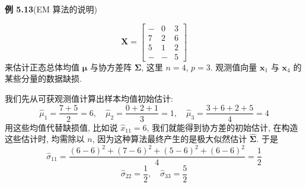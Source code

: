 \noindent\textbf{例 5.13}\quad (EM 算法的说明)

\[
\mathbf{X}=\begin{bmatrix}
-&0&3\\
7&2&6\\
5&1&2\\
-&-&5
\end{bmatrix}
\]
来估计正态总体均值 $\boldsymbol{\mu}$ 与协方差阵 $\boldsymbol{\Sigma}$, 这里 $n=4$, $p=3$. 观测值向量 $\mathbf{x}_1$ 与 $\mathbf{x}_4$ 的某些分量的数据缺损.

我们先从可获观测值计算出样本均值初始估计:
\[
\hat{\mu}_1=\frac{7+5}{2}=6, \quad
\hat{\mu}_2=\frac{0+2+1}{3}=1, \quad
\hat{\mu}_3=\frac{3+6+2+5}{4}=4
\]
用这些均值代替缺损值, 比如说 $\hat{x}_{11}=6$, 我们就能得到协方差的初始估计, 在构造这些估计时, 均需除以 $n$, 因为这种算法最终产生的是极大似然估计 $\hat{\boldsymbol{\Sigma}}$. 于是
\[
\hat{\sigma}_{11}=\frac{(6-6)^2+(7-6)^2+(5-6)^2+(6-6)^2}{4}=\frac{1}{2}
\]
\[
\hat{\sigma}_{22}=\frac{1}{2}, \quad \hat{\sigma}_{33}=\frac{5}{2}
\]
